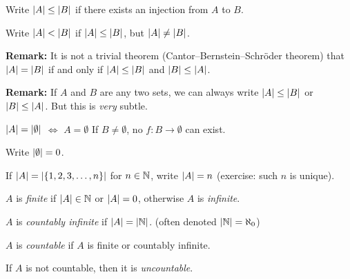 \documentclass[10pt,aspectratio=169]{beamer}
\begin{document}
\begin{frame}

\begin{definition}
Write
$\left\lvert {A} \right\rvert \leq \left\lvert {B} \right\rvert$
if there exists an injection from $A$ to $B$.

\pause
Write $\left\lvert {A} \right\rvert < \left\lvert {B} \right\rvert$
if $\left\lvert {A} \right\rvert \leq \left\lvert {B} \right\rvert$, but
$\left\lvert {A} \right\rvert \not= \left\lvert {B} \right\rvert$.
\end{definition}

\pause
\textbf{Remark:}
It is not a trivial theorem (Cantor--Bernstein--Schr\"oder theorem) that
$\left\lvert {A} \right\rvert = \left\lvert {B} \right\rvert$ if and only if
$\left\lvert {A} \right\rvert \leq \left\lvert {B} \right\rvert$ and
$\left\lvert {B} \right\rvert \leq \left\lvert {A} \right\rvert$.

\medskip
\pause

\textbf{Remark:}
If $A$ and $B$ are any two sets,
we can always write $\left\lvert {A} \right\rvert \leq \left\lvert {B} \right\rvert$ or
$\left\lvert {B} \right\rvert \leq \left\lvert {A} \right\rvert$.  But this is \emph{very} subtle.

\pause
\medskip

$\left\lvert {A} \right\rvert = \left\lvert {\emptyset} \right\rvert$ $\Leftrightarrow$ $A = \emptyset$
\quad
If $B \not= \emptyset$,
no $f \colon B \to \emptyset$ can exist.

\pause
Write $\left\lvert {\emptyset} \right\rvert = 0$.

\medskip
\pause

If $\left\lvert {A} \right\rvert = \left\lvert {\{ 1,2,3,\ldots,n \}} \right\rvert$ for $n \in {\mathbb{N}}$, write
$\left\lvert {A} \right\rvert = n$ (exercise: such $n$ is unique).

\pause

\begin{definition}
$A$ is \emph{finite} if $\left\lvert {A} \right\rvert \in {\mathbb{N}}$ or $\left\lvert {A} \right\rvert=0$,
\pause
\quad otherwise $A$ is \emph{infinite}.

\pause
$A$ is \emph{countably infinite} if $\left\lvert {A} \right\rvert = \left\lvert {{\mathbb{N}}} \right\rvert$.
\qquad (often denoted $\left\lvert {{\mathbb{N}}} \right\rvert = \aleph_0$)

\pause
$A$ is \emph{countable} if $A$ is finite or countably infinite.

\pause
If $A$ is not countable, then it is \emph{uncountable}.
\end{definition}
\end{frame}
\end{document}
